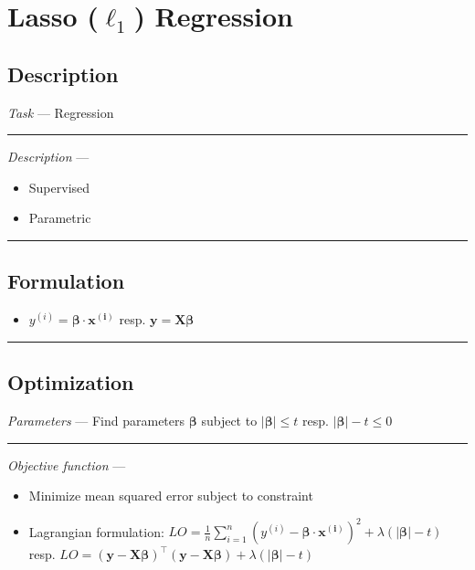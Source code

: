 \section{Lasso ($\ell_1$) Regression}
\subsection*{Description}
\emph{Task} --- Regression

{\color{lightgray}\hrule height 0.001mm}

\emph{Description} --- 
\begin{itemize}
    \item Supervised 
    \item Parametric
\end{itemize}

{\color{black}\hrule height 0.001mm}

\subsection*{Formulation}

\begin{itemize}
    \item $y^{(i)} = \boldsymbol{\beta} \cdot \boldsymbol{x^{(i)}}$ resp. $\boldsymbol{y} = \boldsymbol{X}\boldsymbol{\beta}$
\end{itemize}

{\color{black}\hrule height 0.001mm}

\subsection*{Optimization}
\emph{Parameters} --- Find parameters $\boldsymbol{\beta}$ subject to $|\boldsymbol{\beta}| \leq t$ resp. $|\boldsymbol{\beta}| - t \leq 0$

{\color{lightgray}\hrule height 0.001mm}

\emph{Objective function} --- 
\begin{itemize}
    \item Minimize mean squared error subject to constraint
    \item Lagrangian formulation: $LO = \frac{1}{n} \sum_{i=1}^n ( y^{(i)} - \boldsymbol{\beta} \cdot \boldsymbol{x^{(i)}} )^2 + \lambda ( |\boldsymbol{\beta}| - t )$ resp. $LO = ( \boldsymbol{y} - \boldsymbol{X}\boldsymbol{\beta})^\intercal( \boldsymbol{y} - \boldsymbol{X}\boldsymbol{\beta} ) + \lambda ( |\boldsymbol{\beta}| - t )$
\end{itemize}

